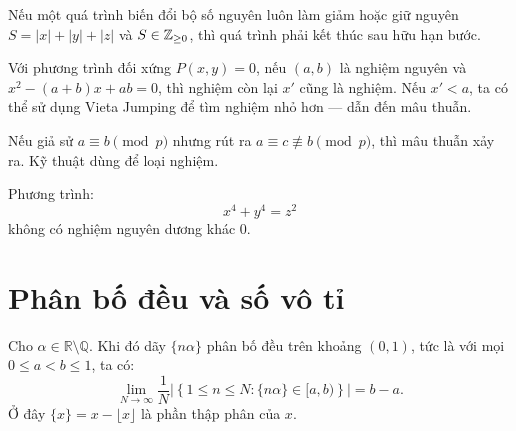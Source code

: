 \documentclass[../imo-training-open-book.tex]{subfiles}
\begin{document}
\vspace{1em}

\begin{theorem}[\href{https://w.wiki/9Wcv}{Monovariant \( S = |x| + |y| + |z| \)}]
    \label{theorem:monovariant-absolute-sum}
    Nếu một quá trình biến đổi bộ số nguyên luôn làm giảm hoặc giữ nguyên \( S = |x| + |y| + |z| \) và \( S \in \mathbb Z_{\ge 0} \), thì quá trình phải kết thúc sau hữu hạn bước.
\end{theorem}

\vspace{1em}

\begin{theorem}
    \label{theorem:vieta-jumping}
    Với phương trình đối xứng \( P(x, y) = 0 \), nếu \( (a, b) \) là nghiệm nguyên và \( x^2 - (a + b)x + ab = 0 \), thì nghiệm còn lại \( x' \) cũng là nghiệm. Nếu \( x' < a \), ta có thể sử dụng Vieta Jumping để tìm nghiệm nhỏ hơn — dẫn đến mâu thuẫn.
\end{theorem}

\vspace{1em}

\begin{lemma}
    \label{lemma:modular-contradiction}
    Nếu giả sử \( a \equiv b \pmod{p} \) nhưng rút ra \( a \equiv c \not\equiv b \pmod{p} \), thì mâu thuẫn xảy ra. Kỹ thuật dùng để loại nghiệm.
\end{lemma}

\vspace{1em}

\begin{theorem}
    \label{theorem:fermat-christmas}
    Phương trình:
    \[
        x^4 + y^4 = z^2
    \]
    không có nghiệm nguyên dương khác 0.
\end{theorem}

\newpage

\section{Phân bố đều và số vô tỉ}

\begin{lemma}
    \label{lemma:irrational-uniform-distribution}
    Cho \( \alpha \in \mathbb{R} \setminus \mathbb{Q} \). Khi đó dãy \( \{ n\alpha \} \) phân bố đều trên khoảng \( (0,1) \), tức là với mọi \( 0 \le a < b \le 1 \), ta có:
    \[
        \lim_{N \to \infty} \frac{1}{N} \left| \left\{ 1 \le n \le N : \{ n\alpha \} \in [a, b) \right\} \right| = b - a.
    \]
    Ở đây \( \{x\} = x - \lfloor x \rfloor \) là phần thập phân của \( x \).
\end{lemma}
\end{document}
